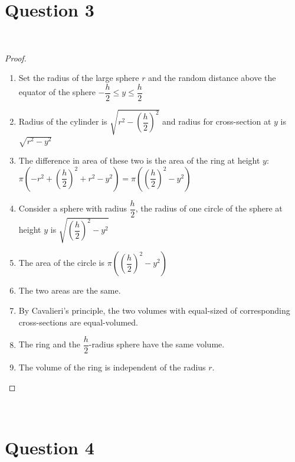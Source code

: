 \documentclass{article}
\begin{document}
\newpage

\section*{Question 3}

~

\begin{proof}
    ~
    \begin{enumerate}
        \item Set the radius of the large sphere $r$ and the random distance above the equator of the sphere $-\dfrac{h}{2}\leq y\leq \dfrac{h}{2}$
        \item Radius of the cylinder is $\sqrt{r^2-\left(\dfrac{h}{2}\right)^2}$ and radius for cross-section at $y$ is $\sqrt{r^2-y^2}$
        \item The difference in area of these two is the area of the ring at height $y$: $\pi\left(-r^2+\left(\dfrac{h}{2}\right)^2+r^2-y^2\right)=\pi\left(\left(\dfrac{h}{2}\right)^2-y^2\right)$
        \item Consider a sphere with radius $\dfrac{h}{2}$, the radius of one circle of the sphere at height $y$ is $\sqrt{\left(\dfrac{h}{2}\right)^2-y^2}$
        \item The area of the circle is $\pi\left(\left(\dfrac{h}{2}\right)^2-y^2\right)$
        \item The two areas are the same.
        \item By Cavalieri’s principle, the two volumes with equal-sized of corresponding cross-sections are equal-volumed.
        \item The ring and the $\dfrac{h}{2}$-radius sphere have the same volume.
        \item The volume of the ring is independent of the radius $r$.
    \end{enumerate}
\end{proof}

\newpage

~

\section*{Question 4}

~
\end{document}
